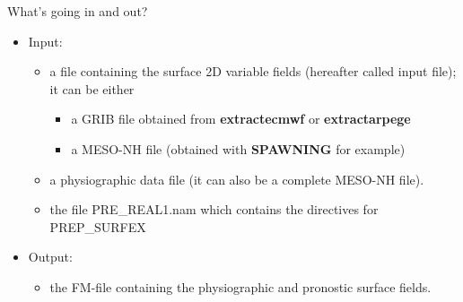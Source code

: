 What's going in and out?
\begin{itemize}
\item Input:
\begin{itemize}
\item a file containing the surface 2D variable fields
(hereafter called input file); it can be either
\begin{itemize}
\item a GRIB file obtained from {\bf extractecmwf} or {\bf extractarpege}
\item a MESO-NH file (obtained with {\bf SPAWNING} for example)
\end{itemize}
\item a physiographic data file (it can also be a complete MESO-NH file).
\item the file PRE\_REAL1.nam which contains the directives for PREP\_SURFEX
\end{itemize}
\item Output:
\begin{itemize}
\item the FM-file containing the physiographic and pronostic surface fields.
\end{itemize}
\end{itemize}


